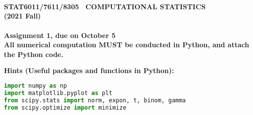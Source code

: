 \documentclass[notitlepage,a4paper,12pt]{article}%
\begin{document}
\begin{center}
\textbf{}\\
\textbf{}\\
\par
\ \\
\textbf{STAT6011/7611/8305 \ COMPUTATIONAL STATISTICS}\\
\textbf{(2021 Fall)}\\
\ \\
\textbf{Assignment 1, due on October 5}\\

\vspace{0.2in}
\textbf{All numerical computation MUST be conducted in Python, and attach the
Python code.}
\end{center}

\begin{adjustwidth}{3em}{0em}
{\bf Hints (Useful packages and functions in Python): }
\begin{lstlisting}[language=Python]
import numpy as np
import matplotlib.pyplot as plt
from scipy.stats import norm, expon, t, binom, gamma
from scipy.optimize import minimize
\end{lstlisting}
\end{adjustwidth}
\end{document}

